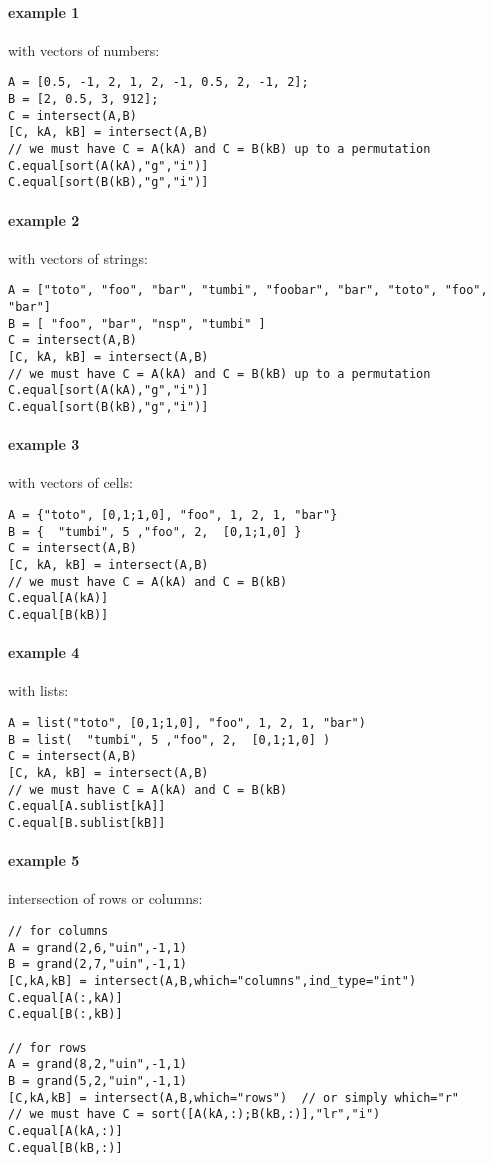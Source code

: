 \begin{examples}

\paragraph{example 1} with vectors of numbers:
\begin{Verbatim}
A = [0.5, -1, 2, 1, 2, -1, 0.5, 2, -1, 2];
B = [2, 0.5, 3, 912];
C = intersect(A,B)
[C, kA, kB] = intersect(A,B)
// we must have C = A(kA) and C = B(kB) up to a permutation
C.equal[sort(A(kA),"g","i")]
C.equal[sort(B(kB),"g","i")]
\end{Verbatim}

\paragraph{example 2} with vectors of strings:
\begin{Verbatim}
A = ["toto", "foo", "bar", "tumbi", "foobar", "bar", "toto", "foo", "bar"]
B = [ "foo", "bar", "nsp", "tumbi" ]
C = intersect(A,B)
[C, kA, kB] = intersect(A,B)
// we must have C = A(kA) and C = B(kB) up to a permutation
C.equal[sort(A(kA),"g","i")]
C.equal[sort(B(kB),"g","i")]
\end{Verbatim}

\paragraph{example 3} with vectors of cells:
  \begin{Verbatim}
A = {"toto", [0,1;1,0], "foo", 1, 2, 1, "bar"}
B = {  "tumbi", 5 ,"foo", 2,  [0,1;1,0] }
C = intersect(A,B)
[C, kA, kB] = intersect(A,B)
// we must have C = A(kA) and C = B(kB)
C.equal[A(kA)]
C.equal[B(kB)]
  \end{Verbatim}

\paragraph{example 4} with lists:
\begin{Verbatim}
A = list("toto", [0,1;1,0], "foo", 1, 2, 1, "bar")
B = list(  "tumbi", 5 ,"foo", 2,  [0,1;1,0] )
C = intersect(A,B)
[C, kA, kB] = intersect(A,B)
// we must have C = A(kA) and C = B(kB)
C.equal[A.sublist[kA]]
C.equal[B.sublist[kB]]
\end{Verbatim}


\paragraph{example 5} intersection of rows or columns:
\begin{Verbatim}
// for columns
A = grand(2,6,"uin",-1,1)
B = grand(2,7,"uin",-1,1)
[C,kA,kB] = intersect(A,B,which="columns",ind_type="int")
C.equal[A(:,kA)]
C.equal[B(:,kB)]

// for rows
A = grand(8,2,"uin",-1,1)
B = grand(5,2,"uin",-1,1)
[C,kA,kB] = intersect(A,B,which="rows")  // or simply which="r"
// we must have C = sort([A(kA,:);B(kB,:)],"lr","i")
C.equal[A(kA,:)]
C.equal[B(kB,:)]
\end{Verbatim}

\end{examples}

